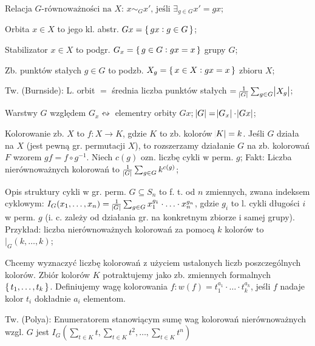 \entry
Relacja $G\text{-równoważności na } X$:
  $x \sim_G x' \text{, jeśli } \exists_{g\in G} x' = gx$;

\entry
Orbita $x \in X$ to jego kl. abstr. $Gx=\set{gx:g\in G}$;

\entry
Stabilizator $x \in X$ to podgr. $G_x = \set{g\in G: gx = x}$ grupy $G$;

\entry
Zb. punktów stałych $g \in G$ to podzb. $X_g = \set{x\in X: gx=x}$ zbioru $X$;

\entry
Tw. (Burnside): L. orbit $=$ średnia liczba punktów stałych
  $=\frac{1}{\abs{G}}\sum_{g\in G}\abs{X_g}$;

\entry
Warstwy $G$ względem $G_x \leftrightsquigarrow$ elementry orbity $Gx$;
$\abs{G} = \abs{G_x} \cdot \abs{Gx}$;

\entry
Kolorowanie zb. $X$ to $f: X\rightarrow K$, gdzie $K$ to zb. kolorów
  $\abs{K} = k$. Jeśli $G$ działa na $X$ (jest pewną gr. permutacji $X$), to
  rozszerzamy działanie $G$ na zb. kolorowań $F$ wzorem $gf=f\circ g^{-1}$.
  Niech $c(g)$ ozn. liczbę cykli w perm. $g$; Fakt: Liczba nierównoważnych
  kolorowań to $\frac{1}{\abs{G}}\sum_{g\in G}k^{c(g)}$;

\entry
Opis struktury cykli w gr. perm. $G \subseteq S_n$ to f. t. od $n$ zmiennych,
  zwana indeksem cyklowym: $I_G(x_1,\ldots,x_n)=
  \frac{1}{\abs{G}}\sum_{g\in G}x_1^{g_1}\cdot\ldots\cdot x_n^{g_n}$, gdzie
  $g_i$ to l. cykli długości $i$ w perm. $g$ (i. c. zależy od działania gr.
  na konkretnym zbiorze i samej grupy). Przykład: liczba nierównoważnych
  kolorowań za pomocą $k$ kolorów to $|_G(k,\ldots,k)$;

\entry
Chcemy wyznaczyć liczbę kolorowań z użyciem ustalonych liczb
  poszczególnych kolorów. Zbiór kolorów $K$ potraktujemy jako zb. zmiennych
  formalnych $\set{t_1,\ldots,t_k}$. Definiujemy wagę kolorowania
  $f: w(f) = t_1^{a_1}\cdot\ldots\cdot t_k^{a_k}$, jeśli $f$ nadaje kolor $t_i$
  dokładnie $a_i$ elementom.

\entry
Tw. (Polya): Enumeratorem stanowiącym sumę wag kolorowań nierównoważnych wzgl.
  $G$ jest $I_G(\sum_{t\in K}t, \sum_{t\in K}t^2, \ldots, \sum_{t\in K}t^n)$
